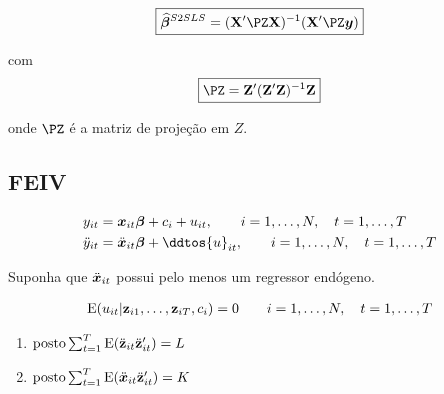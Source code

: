 \documentclass[11pt, oneside, a4paper, article]{article}
\numberwithin{equation}{section}
\begin{document}
\begin{description}
\vspace{-2 em}
\begin{align*}
\boxed{
\betavechat^{S2SLS} =  ( \Xmat' \PZ \Xmat )^{-1} ( \Xmat' \PZ \yvec ) }
\end{align*}

\noindent
com
\begin{align*}
\boxed{\PZ = \Zmat'(\Zmat'\Zmat)^{-1}\Zmat }
\end{align*}

\noindent
onde
$\PZ$ é a matriz de projeção em $Z$.

\clearpage
\subsection{FEIV}

\vspace{-2 em}
\begin{align*}
y_{it} &= \xvec_{it}\betavec + c_{i} + u_{it}, 
\qquad i = 1, \dots, N, \quad t = 1, \dots, T
\\
\ddot{y}_{it} &= \ddot{\xvec}_{it}\betavec + \ddtos{u}_{it}, 
\qquad i = 1, \dots, N, \quad t = 1, \dots, T
\end{align*}

\noindent
Suponha que $\ddot{\boldsymbol{x}}_{it}$ possui pelo menos um regressor endógeno.


\begin{hypo}
\begin{align*}
	\text{E}(u_{it} | \mathbf{z}_{i1}, \dots, \mathbf{z}_{iT}, c_{i}) = 0	
\qquad i = 1, \dots, N, \quad t = 1, \dots, T
\end{align*}
\end{hypo}

\begin{hypo}
\item
\begin{enumerate}[label= \alph*)]
\item  $\text{posto} \sum_{t=1}^{T} \text{E}( \ddot{\mathbf{z}}_{it}\ddot{\mathbf{z}}_{it}' ) = L$
\item  $\text{posto} \sum_{t=1}^{T} \text{E}( \ddot{\boldsymbol{x}}_{it}\ddot{\mathbf{z}}_{it}' ) = K$
\end{enumerate}
\end{hypo}


\end{description}
\end{document}
